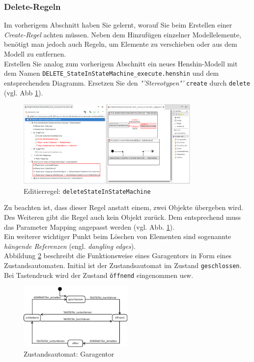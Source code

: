 \subsubsection*{Delete-Regeln}

Im vorherigem Abschnitt haben Sie gelernt, worauf Sie beim Erstellen einer \textit{Create-Regel} achten müssen.
Neben dem Hinzufügen einzelner Modellelemente, benötigt man jedoch auch Regeln, um Elemente zu verschieben oder aus dem Modell zu entfernen.\\
Erstellen Sie analog zum vorherigem Abschnitt ein neues Henshin-Modell mit dem Namen \texttt{DELETE\_StateInStateMachine\_execute.henshin} und dem entsprechenden Diagramm.
Ersetzen Sie den \textit{"'Stereotypen"'} \texttt{create} durch \texttt{delete} (vgl. Abb \ref{silift-editrule_deleteStateInStateMachine}).

\begin{figure}[H]
\centering
\includegraphics[width=0.8\textwidth]{editrules/graphics/silift-editrule_delete_stateInStateMachine.png}
\caption{Editierregel: \texttt{deleteStateInStateMachine}}
\label{silift-editrule_deleteStateInStateMachine}
\end{figure}

Zu beachten ist, dass dieser Regel anstatt einem, zwei Objekte übergeben wird. 
Des Weiteren gibt die Regel auch kein Objekt zurück. 
Dem entsprechend muss das Parameter Mapping angepasst werden (vgl. Abb. \ref{silift-editrule_deleteStateInStateMachine}).\\
Ein weiterer wichtiger Punkt beim Löschen von Elementen sind sogenannte \textit{hängende Referenzen} (engl. \textit{dangling edges}).\\
Abbildung \ref{statemachine_garagedoor} beschreibt die Funktionsweise eines Garagentors in Form eines Zustandsautomaten. 
Initial ist der Zustandsautomat im Zustand \texttt{geschlossen}. 
Bei Tastendruck wird der Zustand \texttt{öffnend} eingenommen usw.

\begin{figure}[H]
\centering
\includegraphics[width=0.5\textwidth]{editrules/graphics/statemachine-garagedoor.jpg}
\caption{Zustandsautomat: Garagentor}
\label{statemachine_garagedoor}
\end{figure}

